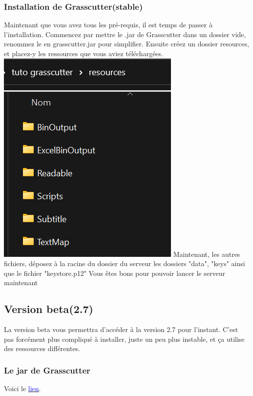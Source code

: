 \documentclass{article}
\begin{document}
\subsubsection{Installation de Grasscutter(stable)}
Maintenant que vous avez tous les pré-requis, il est temps de passer à l'installation.\newline
Commencez par mettre le .jar de Grasscutter dans un dossier vide, renommez le en grasscutter.jar pour simplifier.\newline
Ensuite créez un dossier resources, et placez-y les ressources que vous aviez téléchargées.\newline
\includegraphics[scale=1]{img/disp_resources.png}\newline
Maintenant, les autres fichiers, déposez à la racine du dossier du serveur les dossiers "data", "keys" ainsi que le fichier "keystore.p12"\newline
Vous êtes bons pour pouvoir lancer le serveur maintenant

\subsection{Version beta(2.7)}
La version beta vous permettra d'accéder à la version 2.7 pour l'instant. C'est pas forcément plus compliqué à installer, juste un peu plus instable, et ça utilise des ressources différentes.

\subsubsection{Le jar de Grasscutter}
Voici le \href{https://drive.google.com/file/d/1cJJUqYeeMITWMGaZNTfPB751rEgFEui3/view?usp=sharing}{\textcolor{blue}{lien}}.\newline
\end{document}
